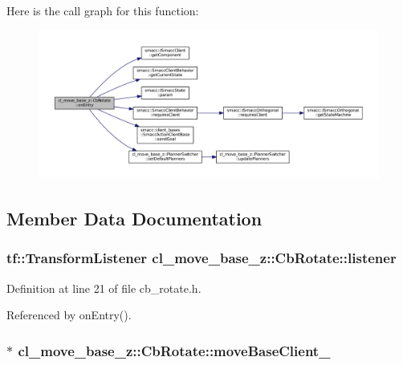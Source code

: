 Here is the call graph for this function\+:
\nopagebreak
\begin{figure}[H]
\begin{center}
\leavevmode
\includegraphics[width=350pt]{classcl__move__base__z_1_1CbRotate_a316ee51ecfd3f10fd1edae0d7d3b26c0_cgraph}
\end{center}
\end{figure}




\subsection{Member Data Documentation}
\subsubsection[{\texorpdfstring{listener}{listener}}]{\setlength{\rightskip}{0pt plus 5cm}tf\+::\+Transform\+Listener cl\+\_\+move\+\_\+base\+\_\+z\+::\+Cb\+Rotate\+::listener}\hypertarget{classcl__move__base__z_1_1CbRotate_a2b57c5f392fde0a3bf38f5fd6e1bde11}{}\label{classcl__move__base__z_1_1CbRotate_a2b57c5f392fde0a3bf38f5fd6e1bde11}


Definition at line 21 of file cb\+\_\+rotate.\+h.



Referenced by on\+Entry().

\subsubsection[{\texorpdfstring{move\+Base\+Client\+\_\+}{moveBaseClient_}}]{$\ast$ cl\+\_\+move\+\_\+base\+\_\+z\+::\+Cb\+Rotate\+::move\+Base\+Client\+\_\+}\hypertarget{classcl__move__base__z_1_1CbRotate_a390623f5bcbdad18fe2a65428e4621cb}{}\label{classcl__move__base__z_1_1CbRotate_a390623f5bcbdad18fe2a65428e4621cb}



